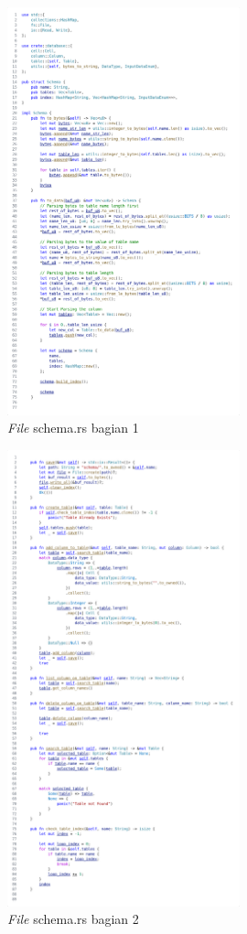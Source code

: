 \begin{figure}[H]
  \centering{}
	\includegraphics[width=0.6\textwidth]{gambar/lampiran/file-schema-1.png}
  \caption{\emph{File} schema.rs bagian 1}
\end{figure}

\begin{figure}[H]
  \centering{}
	\includegraphics[width=0.6\textwidth]{gambar/lampiran/file-schema-2.png}
  \caption{\emph{File} schema.rs bagian 2}
\end{figure}

